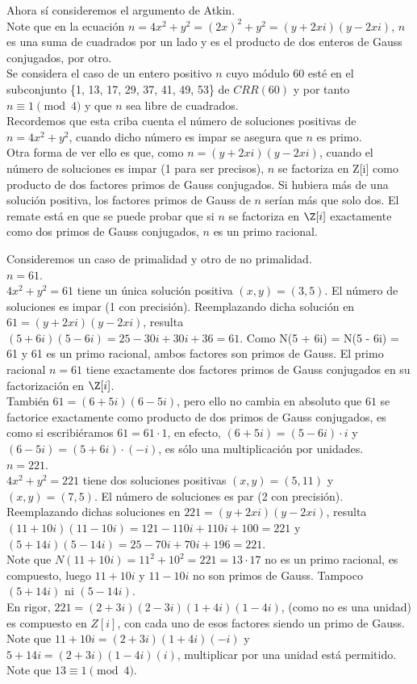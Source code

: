 Ahora sí consideremos el argumento de Atkin. \\
Note que en la ecuación $n = 4x^2+y^2 = (2x)^2+y^2 = (y + 2xi)(y - 2xi)$, $n$ es una suma de cuadrados por un lado y es el producto de dos enteros de Gauss conjugados, por otro. \\
Se considera el caso de un entero positivo $n$ cuyo módulo 60 esté en el subconjunto \{1, 13, 17, 29, 37, 41, 49, 53\} de $CRR(60)$ y por tanto $n \equiv 1 \pmod 4$ y que $n$ sea libre de cuadrados. \\
Recordemos que esta criba cuenta el número de soluciones positivas de $n = 4x^2+y^2$, cuando dicho número es impar se asegura que $n$ es primo. \\
Otra forma de ver ello es que, como $n = (y + 2xi)(y - 2xi)$, cuando el número de soluciones es impar (1 para ser precisos), $n$ se factoriza en Z[i] como producto de dos factores primos de Gauss conjugados. Si hubiera más de una solución positiva, los factores primos de Gauss de $n$ serían más que solo dos. El remate está en que se puede probar que si $n$ se factoriza en $\Z[i]$ exactamente como dos primos de Gauss conjugados, $n$ es un primo racional.

\begin{ejemplo} 
Consideremos un caso de primalidad y otro de no primalidad. \\
$n = 61$. \\
$4x^2+y^2 = 61$ tiene un única solución positiva $(x,y) = (3,5)$. 
El número de soluciones es impar (1 con precisión).
Reemplazando dicha solución en $61 = (y + 2xi)(y - 2xi)$, resulta $(5 + 6i)(5 - 6i) = 25 - 30i + 30i + 36 = 61$.
Como N(5 + 6i) = N(5 - 6i) = 61 y 61 es un primo racional, ambos factores son primos de Gauss. El primo racional $n = 61$ tiene exactamente dos factores primos de Gauss conjugados en su factorización en $\Z[i]$. \\
También $61 = (6 + 5i)(6 - 5i)$, pero ello no cambia en absoluto que $61$ se factorice exactamente como producto de dos primos de Gauss conjugados, es como si escribiéramos $61 = 61 \cdot 1$, en efecto, $(6 + 5i) = (5 - 6i) \cdot i$ y $(6 - 5i) = (5 + 6i) \cdot (-i)$, es sólo una multiplicación por unidades. \\
$n = 221$. \\
$4x^2+y^2 = 221$ tiene dos soluciones positivas $(x,y) = (5,11)$ y $(x,y) = (7,5)$. 
El número de soluciones es par (2 con precisión).
Reemplazando dichas soluciones en $221 = (y + 2xi)(y - 2xi)$, resulta $(11 + 10i)(11 - 10i) = 121 - 110i + 110i + 100 = 221$ y $(5 + 14i)(5 - 14i) = 25 - 70i + 70i + 196 = 221$. \\
Note que $N(11+10i)=11^2+10^2=221=13 \cdot 17$ no es un primo racional, es compuesto, luego $11+10i$ y $11-10i$ no son primos de Gauss.
Tampoco $(5 + 14i)$ ni $(5 - 14i)$. \\
En rigor, $221 = (2+3i)(2-3i)(1+4i)(1-4i)$, (como no es una unidad) es compuesto en $Z[i]$, con cada uno de esos factores siendo un primo de Gauss.\\
Note que $11 + 10i = (2+3i)(1+4i)(-i)$ y $5 + 14i = (2+3i)(1-4i)(i)$, multiplicar por una unidad está permitido. \\
Note que $13 \equiv 1 \pmod 4$.
\end{ejemplo}

